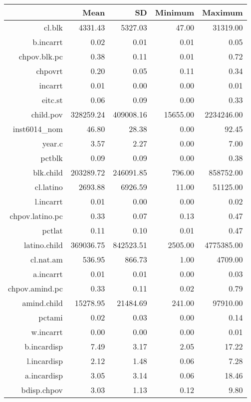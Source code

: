 \begin{table}[ht]
\centering
\begin{tabular}{rrrrr}
  \hline
 & Mean & SD & Minimum & Maximum \\ 
  \hline
cl.blk & 4331.43 & 5327.03 & 47.00 & 31319.00 \\ 
  b.incarrt & 0.02 & 0.01 & 0.01 & 0.05 \\ 
  chpov.blk.pc & 0.38 & 0.11 & 0.01 & 0.72 \\ 
  chpovrt & 0.20 & 0.05 & 0.11 & 0.34 \\ 
  incarrt & 0.01 & 0.00 & 0.00 & 0.01 \\ 
  eitc.st & 0.06 & 0.09 & 0.00 & 0.33 \\ 
  child.pov & 328259.24 & 409008.16 & 15655.00 & 2234246.00 \\ 
  inst6014\_nom & 46.80 & 28.38 & 0.00 & 92.45 \\ 
  year.c & 3.57 & 2.27 & 0.00 & 7.00 \\ 
  pctblk & 0.09 & 0.09 & 0.00 & 0.38 \\ 
  blk.child & 203289.72 & 246091.85 & 796.00 & 858752.00 \\ 
  cl.latino & 2693.88 & 6926.59 & 11.00 & 51125.00 \\ 
  l.incarrt & 0.01 & 0.00 & 0.00 & 0.02 \\ 
  chpov.latino.pc & 0.33 & 0.07 & 0.13 & 0.47 \\ 
  pctlat & 0.11 & 0.10 & 0.01 & 0.47 \\ 
  latino.child & 369036.75 & 842523.51 & 2505.00 & 4775385.00 \\ 
  cl.nat.am & 536.95 & 866.73 & 1.00 & 4709.00 \\ 
  a.incarrt & 0.01 & 0.01 & 0.00 & 0.03 \\ 
  chpov.amind.pc & 0.33 & 0.11 & 0.02 & 0.79 \\ 
  amind.child & 15278.95 & 21484.69 & 241.00 & 97910.00 \\ 
  pctami & 0.02 & 0.03 & 0.00 & 0.14 \\ 
  w.incarrt & 0.00 & 0.00 & 0.00 & 0.01 \\ 
  b.incardisp & 7.49 & 3.17 & 2.05 & 17.22 \\ 
  l.incardisp & 2.12 & 1.48 & 0.06 & 7.28 \\ 
  a.incardisp & 3.05 & 3.14 & 0.06 & 18.46 \\ 
  bdisp.chpov & 3.03 & 1.13 & 0.12 & 9.80 \\ 

\end{tabular}
\end{table}

